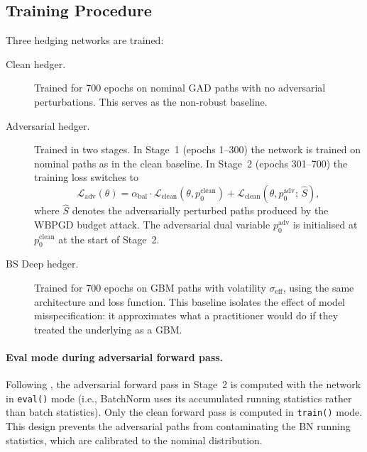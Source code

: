 \subsection{Training Procedure}

Three hedging networks are trained:

\begin{description}
  \item[Clean hedger.]  Trained for 700 epochs on nominal GAD paths with no
        adversarial perturbations.  This serves as the non-robust baseline.

  \item[Adversarial hedger.]  Trained in two stages.  In Stage~1 (epochs
        1--300) the network is trained on nominal paths as in the clean
        baseline.  In Stage~2 (epochs 301--700) the training loss switches to
        \begin{equation}
          \mathcal{L}_{\mathrm{adv}}(\theta)
          = \alpha_{\mathrm{bal}} \cdot \mathcal{L}_{\mathrm{clean}}(\theta,
              p_0^{\mathrm{clean}})
          + \mathcal{L}_{\mathrm{clean}}(\theta, p_0^{\mathrm{adv}};\, \hat{S}),
          \label{eq:gad_adv_loss}
        \end{equation}
        where $\hat{S}$ denotes the adversarially perturbed paths produced by
        the WBPGD budget attack.  The adversarial dual variable
        $p_0^{\mathrm{adv}}$ is initialised at $p_0^{\mathrm{clean}}$ at the
        start of Stage~2.

  \item[BS Deep hedger.]  Trained for 700 epochs on GBM paths with volatility
        $\sigma_{\mathrm{eff}}$, using the same architecture and loss function.
        This baseline isolates the effect of model misspecification: it
        approximates what a practitioner would do if they treated the
        underlying as a GBM.
\end{description}

\paragraph{Eval mode during adversarial forward pass.}
Following \citet{he2025}, the adversarial forward pass in Stage~2 is computed
with the network in \texttt{eval()} mode (i.e., BatchNorm uses its accumulated
running statistics rather than batch statistics).  Only the clean forward pass
is computed in \texttt{train()} mode.  This design prevents the adversarial
paths from contaminating the BN running statistics, which are calibrated to
the nominal distribution.

